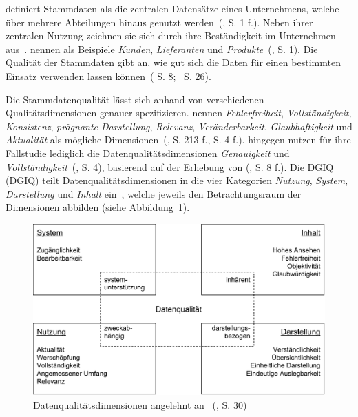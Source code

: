 \documentclass[
  language=german, %
  type=bachelor,%
  ngerman
]{isthesis}
\begin{document}
\begin{content}
	\textsc{\citeauthor{otto2012design}} definiert Stammdaten als die zentralen
	Datensätze eines Unternehmens, welche über mehrere Abteilungen hinaus genutzt
	werden~(\citeyear{otto2012design}, S.  1 f.).  Neben ihrer zentralen Nutzung
	zeichnen sie sich durch ihre Beständigkeit im Unternehmen aus~\cite[][S.
	1]{knolmayer2006quality}.  \textsc{\citeauthor{knolmayer2006quality}} nennen
	als Beispiele \textit{Kunden}, \textit{Lieferanten} und
	\textit{Produkte}~(\citeyear{knolmayer2006quality}, S. 1). Die Qualität der
	Stammdaten gibt an, wie gut sich die Daten für einen bestimmten Einsatz
	verwenden lassen können~(\citeauthor{otto2011stammdatenmanagement}
	\citeyear{otto2011stammdatenmanagement} S.
	8;~\citeauthor{hinrichs2002datenqualitatsmanagement}
	\citeyear{hinrichs2002datenqualitatsmanagement} S. 26).

	Die Stammdatenqualität lässt sich anhand von verschiedenen
	Qualitätsdimensionen genauer spezifizieren.
	\textsc{\citeauthor{pipino2002data}} nennen \zB{} \textit{Fehlerfreiheit},
	\textit{Vollständigkeit}, \textit{Konsistenz}, \textit{prägnante
	Darstellung}, \textit{Relevanz}, \textit{Veränderbarkeit},
	\textit{Glaubhaftigkeit} und \textit{Aktualität} als mögliche
	Dimensionen~(\citeyear{pipino2002data, legner2007stammdaten}, S. 213 f., S. 4
	f.). \textsc{\citeauthor{baghi2013controlling}} hingegen nutzen für ihre
	Fallstudie lediglich die Datenqualitätsdimensionen \textit{Genauigkeit} und
	\textit{Vollständigkeit}~(\citeyear{baghi2013controlling}, S. 4), basierend
	auf der Erhebung von
	\textsc{\citeauthor{wand1996anchoring}} (\citeyear{wand1996anchoring}, S. 8
	f.). Die \acrlong{DGIQ} (\acrshort{DGIQ}) teilt Datenqualitätsdimensionen in
	die vier Kategorien \textit{Nutzung}, \textit{System}, \textit{Darstellung}
	und \textit{Inhalt} ein~\cite[][S. 29 - 31]{rohweder2015informationsqualitat},
	welche jeweils den Betrachtungsraum der Dimensionen abbilden (siehe
	Abbildung~\ref{15-dimensions}).

  \begin{figure}
    \includegraphics[scale=0.60]{content/figures/15-dimensions}
    \caption[Datenqualitätsdimensionen]{Datenqualitätsdimensionen angelehnt an~\textsc{\citeauthor{rohweder2015informationsqualitat}} (\citeyear{rohweder2015informationsqualitat}, S. 30)}\label{15-dimensions}
  \end{figure}


\end{content}
\end{document}
